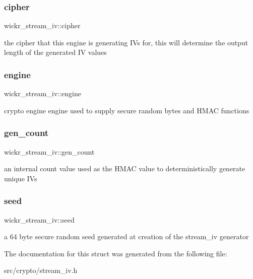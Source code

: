 \subsubsection{\texorpdfstring{cipher}{cipher}}
{\footnotesize\ttfamily wickr\+\_\+stream\+\_\+iv\+::cipher}

the cipher that this engine is generating IV\textquotesingle{}s for, this will determine the output length of the generated IV values \mbox{\label{structwickr__stream__iv_a8c597718ade583db19204df7bfed7e85}} 
\subsubsection{\texorpdfstring{engine}{engine}}
{\footnotesize\ttfamily wickr\+\_\+stream\+\_\+iv\+::engine}

crypto engine engine used to supply secure random bytes and H\+M\+AC functions \mbox{\label{structwickr__stream__iv_ae7d500c34333c546ee044fe875e10dfc}} 
\subsubsection{\texorpdfstring{gen\+\_\+count}{gen\_count}}
{\footnotesize\ttfamily wickr\+\_\+stream\+\_\+iv\+::gen\+\_\+count}

an internal count value used as the H\+M\+AC value to deterministically generate unique I\+Vs \mbox{\label{structwickr__stream__iv_a221017bc41b4cc36bf31f13a0c299db1}} 
\subsubsection{\texorpdfstring{seed}{seed}}
{\footnotesize\ttfamily wickr\+\_\+stream\+\_\+iv\+::seed}

a 64 byte secure random seed generated at creation of the stream\+\_\+iv generator 

The documentation for this struct was generated from the following file\+:\begin{DoxyCompactItemize}
\item 
src/crypto/stream\+\_\+iv.\+h\end{DoxyCompactItemize}
